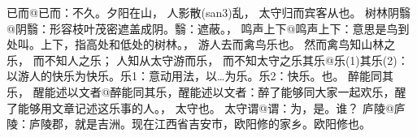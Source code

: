 \documentclass[a4paper]{article}
\begin{document}
已而@{已而：不久。}夕阳在山，
人影散(san3)乱，
太守归而宾客从也。
树林阴翳@{阴翳：形容枝叶茂密遮盖成阴。翳：遮蔽。}，
鸣声上下@{鸣声上下：意思是鸟到处叫。上下，指高处和低处的树林。}，
游人去而禽鸟乐也。
然而禽鸟知山林之乐，
而不知人之乐；
人知从太守游而乐，
而不知太守之乐其乐@{乐(1)其乐(2)：以游人的快乐为快乐。乐1：意动用法，以…为乐。乐2：快乐。}也。
醉能同其乐，
醒能述以文者@{醉能同其乐，醒能述以文者：醉了能够同大家一起欢乐，醒了能够用文章记述这乐事的人。}，
太守也。
太守谓@{谓：为，是。}谁？
庐陵@{庐陵：庐陵郡，就是吉洲。现在江西省吉安市，欧阳修的家乡。}欧阳修也。

\end{document}
